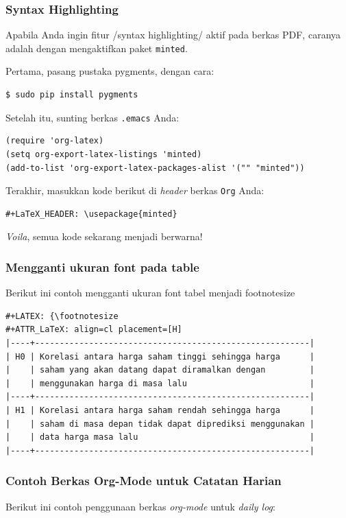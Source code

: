\documentclass{article}
\begin{document}
\subsubsection{Syntax Highlighting}
Apabila Anda ingin fitur /syntax highlighting/ aktif pada berkas PDF,
caranya adalah dengan mengaktifkan paket \verb=minted=.

Pertama, pasang pustaka pygments, dengan cara:

\begin{verbatim}
$ sudo pip install pygments
\end{verbatim}

Setelah itu, sunting berkas \verb=.emacs= Anda:

\begin{verbatim}
(require 'org-latex)
(setq org-export-latex-listings 'minted)
(add-to-list 'org-export-latex-packages-alist '("" "minted"))
\end{verbatim}

Terakhir, masukkan kode berikut di \emph{header} berkas \verb=Org= Anda:
\begin{verbatim}
#+LaTeX_HEADER: \usepackage{minted}
\end{verbatim}

\emph{Voila}, semua kode sekarang menjadi berwarna!

\subsubsection{Mengganti ukuran font pada table}
Berikut ini contoh mengganti ukuran font tabel menjadi footnotesize
\begin{verbatim}
#+LATEX: {\footnotesize
#+ATTR_LaTeX: align=cl placement=[H]
|----+--------------------------------------------------------|
| H0 | Korelasi antara harga saham tinggi sehingga harga      |
|    | saham yang akan datang dapat diramalkan dengan         |
|    | menggunakan harga di masa lalu                         |
|----+--------------------------------------------------------|
| H1 | Korelasi antara harga saham rendah sehingga harga      |
|    | saham di masa depan tidak dapat diprediksi menggunakan |
|    | data harga masa lalu                                   |
|----+--------------------------------------------------------|
\end{verbatim}

\subsubsection{Contoh Berkas Org-Mode untuk Catatan Harian}
Berikut ini contoh penggunaan berkas \emph{org-mode} untuk \emph{daily log}:
\end{document}
